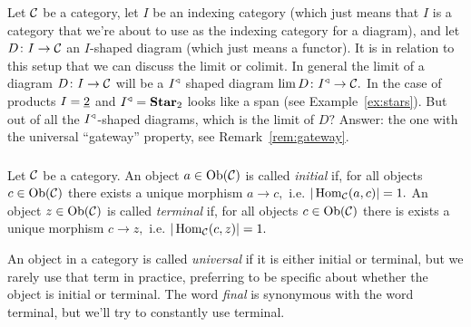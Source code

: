 \documentclass[../main/CT4S-EN-RU]{subfiles}
\begin{document}
\begin{blockENG}
Let $\mathcal{C}$ be a category, let $I$ be an indexing category (which just means that $I$ is a category that we're about to use as the indexing category for a diagram), and let $D\colon I\rightarrow\mathcal{C}$ an $I$-shaped diagram (which just means a functor). It is in relation to this setup that we can discuss the limit or colimit. In general the limit of a diagram $D\colon I\rightarrow\mathcal{C}$ will be a $I^\triangleleft$ shaped diagram $\lim D\colon I^\triangleleft\rightarrow\mathcal{C}.$ In the case of products $I=\underline{2}$ and $I^\triangleleft={\mathbf{Star}}_2$ looks like a span (see Example~\ref{ex:stars}). But out of all the $I^\triangleleft$-shaped diagrams, which is the limit of $D?$ Answer: the one with the universal “gateway” property, see Remark~\ref{rem:gateway}.
\end{blockENG}

\begin{blockRUS}
\end{blockRUS}


\subsubsection{}

\begin{definitionENG}
Let $\mathcal{C}$ be a category. An object $a\in\operatorname{Ob}(\mathcal{C})$ is called {\em initial} if, for all objects $c\in\operatorname{Ob}(\mathcal{C})$ there exists a unique morphism $a\to c,$ i.e. $|\operatorname{Hom}_\mathcal{C}(a,c)|=1.$ An object $z\in\operatorname{Ob}(\mathcal{C})$ is called {\em terminal} if, for all objects $c\in\operatorname{Ob}(\mathcal{C})$ there is exists a unique morphism $c\to z,$ i.e. $|\operatorname{Hom}_\mathcal{C}(c,z)|=1.$ 
\end{definitionENG}

\begin{definitionRUS}
\end{definitionRUS}

\begin{blockENG}
An object in a category is called {\em universal} if it is either initial or terminal, but we rarely use that term in practice, preferring to be specific about whether the object is initial or terminal. The word {\em final} is synonymous with the word terminal, but we'll try to constantly use terminal. 
\end{blockENG}

\begin{blockRUS}
\end{blockRUS}
\end{document}

